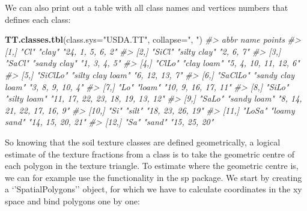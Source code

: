 \documentclass[11pt]{krantz}
\newenvironment{Shaded}{\begin{snugshade}}{\end{snugshade}}
\newcommand{\CommentTok}[1]{\textcolor[rgb]{0.37,0.37,0.37}{\textit{#1}}}
\newcommand{\DataTypeTok}[1]{\textcolor[rgb]{0.27,0.27,0.27}{#1}}
\newcommand{\KeywordTok}[1]{\textcolor[rgb]{0.27,0.27,0.27}{\textbf{#1}}}
\newcommand{\NormalTok}[1]{#1}
\newcommand{\StringTok}[1]{\textcolor[rgb]{0.5,0.5,0.5}{#1}}
\theoremstyle{definition}
\theoremstyle{definition}
\theoremstyle{definition}
\theoremstyle{remark}
\begin{document}
We can also print out a table with all class names and vertices numbers
that defines each class:

\begin{Shaded}
\begin{Highlighting}[]
\KeywordTok{TT.classes.tbl}\NormalTok{(}\DataTypeTok{class.sys=}\StringTok{"USDA.TT"}\NormalTok{, }\DataTypeTok{collapse=}\StringTok{", "}\NormalTok{)}
\CommentTok{#>       abbr     name              points                          }
\CommentTok{#>  [1,] "Cl"     "clay"            "24, 1, 5, 6, 2"                }
\CommentTok{#>  [2,] "SiCl"   "silty clay"      "2, 6, 7"                       }
\CommentTok{#>  [3,] "SaCl"   "sandy clay"      "1, 3, 4, 5"                    }
\CommentTok{#>  [4,] "ClLo"   "clay loam"       "5, 4, 10, 11, 12, 6"           }
\CommentTok{#>  [5,] "SiClLo" "silty clay loam" "6, 12, 13, 7"                  }
\CommentTok{#>  [6,] "SaClLo" "sandy clay loam" "3, 8, 9, 10, 4"                }
\CommentTok{#>  [7,] "Lo"     "loam"            "10, 9, 16, 17, 11"             }
\CommentTok{#>  [8,] "SiLo"   "silty loam"      "11, 17, 22, 23, 18, 19, 13, 12"}
\CommentTok{#>  [9,] "SaLo"   "sandy loam"      "8, 14, 21, 22, 17, 16, 9"      }
\CommentTok{#> [10,] "Si"     "silt"            "18, 23, 26, 19"                }
\CommentTok{#> [11,] "LoSa"   "loamy sand"      "14, 15, 20, 21"                }
\CommentTok{#> [12,] "Sa"     "sand"            "15, 25, 20"}
\end{Highlighting}
\end{Shaded}

So knowing that the soil texture classes are defined geometrically, a
logical estimate of the texture fractions from a class is to take the
geometric centre of each polygon in the texture triangle. To estimate
where the geometric centre is, we can for example use the functionality
in the sp package. We start by creating a `'SpatialPolygons'' object,
for which we have to calculate coordinates in the xy space and bind
polygons one by one:
\end{document}
